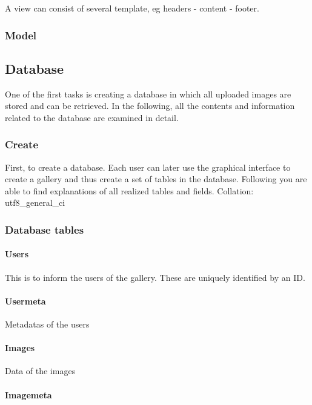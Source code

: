 \documentclass[a4paper,12pt,oneside]{article} %
\begin{document}
A view can consist of several template, eg headers - content - footer.


\subsubsection*{Model}


\subsection{Database }

One of the first tasks is creating a database in which all uploaded
images are stored and can be retrieved. In the following, all the
contents and information related to the database are examined in detail.


\subsubsection{Create}

First, to create a database.  Each user can later use the graphical
interface to create a gallery and thus create a set of tables in the
database. Following you are able to find explanations of all realized
tables and fields. Collation: utf8\_general\_ci


\subsubsection{Database tables}


\paragraph*{Users}

This is to inform the users of the gallery. These are uniquely identified
by an ID.


\paragraph*{Usermeta}

Metadatas of the users


\paragraph*{Images}

Data of the images


\paragraph*{Imagemeta}
\end{document}
